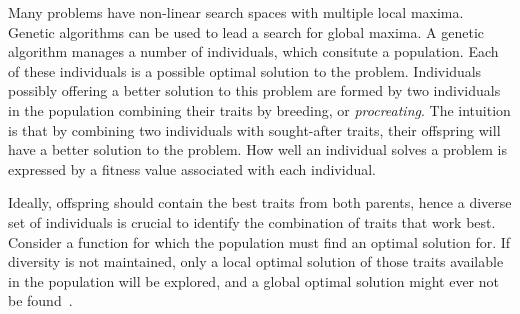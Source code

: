 Many problems have non-linear search spaces with multiple local maxima. Genetic algorithms can be used to lead a search for global maxima. A genetic algorithm manages a number of individuals, which consitute a population. Each of these individuals is a possible optimal solution to the problem. Individuals possibly offering a better solution to this problem are formed by two individuals in the population combining their traits by breeding, or \emph{procreating}. The intuition is that by combining two individuals with sought-after traits, their offspring will have a better solution to the problem. How well an individual solves a problem is expressed by a fitness value associated with each individual.

Ideally, offspring should contain the best traits from both parents, hence a diverse set of individuals is crucial to identify the combination of traits that work best. Consider a function for which the population must find an optimal solution for. If diversity is not maintained, only a local optimal solution of those traits available in the population will be explored, and a global optimal solution might ever not be found~\cite{ursem2002diversity}.



